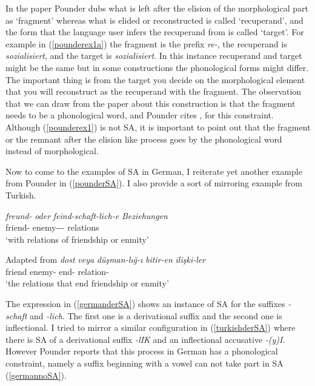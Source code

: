 In the paper Pounder dubs what is left after the elision of the morphological part as `fragment' whereas what is elided or reconstructed is called `recuperand', and the form that the language user infers the recuperand from is called `target'. For example in (\ref{pounderex1a}) the fragment is the prefix \textit{re-}, the recuperand is \textit{sozialisiert}, and the target is \textit{sozialisiert}. In this instance recuperand and target might be the same but in some constructions the phonological forms might differ. The important thing is from the target you decide on the morphological element that you will reconstruct as the recuperand with the fragment. The observation that we can draw from the paper about this construction is that the fragment needs to be a phonological word, and Pounder cites \cite{smith2000word},  for this constraint. Although (\ref{pounderex1}) is not SA, it is important to point out that the fragment or the remnant after the elision like process goes by the phonological word instead of morphological. 

Now to come to the examples of SA in German, I reiterate yet another example from Pounder in (\ref{pounderSA}). I also provide a sort of mirroring example from Turkish.

\begin{exe}
    \ex \label{pounderSA}
    \begin{xlist}
        \ex \label{germanderSA}
        \gll 
        \textit{freund-} \textit{oder} \textit{feind-schaft-lich-e} \textit{Beziehungen} \\ friend- {\Or} enemy-{\Der}-{\Der}-{\Pl} relations \\
        \glt `with relations of friendship or enmity'
        
        \hfill Adapted from \cite{pounder2006broken}
        \ex \label{turkishderSA} 
        \gll 
        \textit{dost} \textit{veya} \textit{düşman-lığ-ı} \textit{bitir-en} \textit{ilişki-ler} \\ friend {\Or} enemy-{\Der} end-{\Fp} relation-{\Pl} \\
        \glt `the relations that end friendship or enmity'
    \end{xlist}
\end{exe}

The expression in (\ref{germanderSA}) shows an instance of SA for the suffixes \textit{-schaft} and \textit{-lich}. The first one is a derivational suffix and the second one is inflectional. I tried to mirror a similar configuration in (\ref{turkishderSA}) where there is SA of a derivational suffix \textit{-lIK} and an inflectional accusative \textit{-(y)I}. However Pounder reports that this process in German has a phonological constraint, namely a suffix beginning with a vowel can not take part in SA (\ref{germannoSA}).

